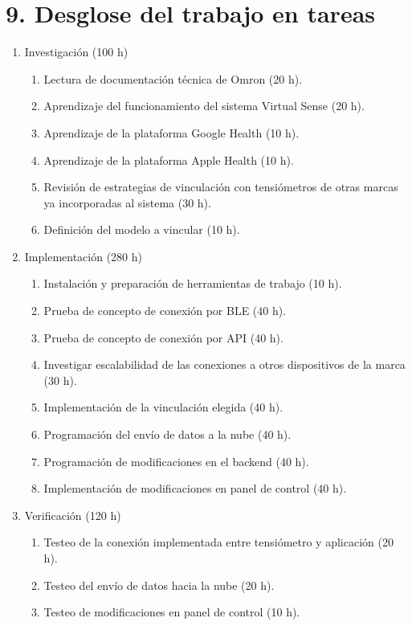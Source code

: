 \documentclass[
11pt, %
]{charter}
\begin{document}
\section{9. Desglose del trabajo en tareas}
\label{sec:wbs}

\begin{enumerate}
\item Investigación (100 h)
	\begin{enumerate}
	\item Lectura de documentación técnica de Omron (20 h).
	\item Aprendizaje del funcionamiento del sistema Virtual Sense (20 h).
	\item Aprendizaje de la plataforma Google Health (10 h).
	\item Aprendizaje de la plataforma Apple Health (10 h).
	\item Revisión de estrategias de vinculación con tensiómetros de otras marcas ya incorporadas al sistema (30 h).
	\item Definición del modelo a vincular (10 h).
	\end{enumerate}
\item Implementación (280 h)
	\begin{enumerate}
	\item Instalación y preparación de herramientas de trabajo (10 h).
	\item Prueba de concepto de conexión por BLE (40 h).
	\item Prueba de concepto de conexión por API (40 h).
	\item Investigar escalabilidad de las conexiones a otros dispositivos de la marca (30 h).
	\item Implementación de la vinculación elegida (40 h).
	\item Programación del envío de datos a la nube (40 h).
	\item Programación de modificaciones en el backend (40 h).
	\item Implementación de modificaciones en panel de control (40 h).
	\end{enumerate}
\item Verificación (120 h)
	\begin{enumerate}
	\item Testeo de la conexión implementada entre tensiómetro y aplicación (20 h).
	\item Testeo del envío de datos hacia la nube (20 h).
	\item Testeo de modificaciones en panel de control (10 h).

\end{enumerate}
\end{enumerate}
\end{document}

